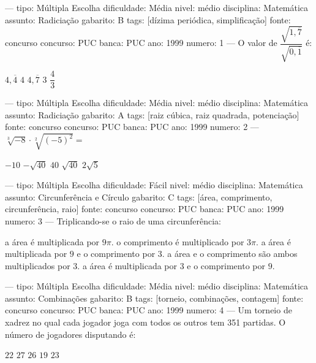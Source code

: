 
---
tipo: Múltipla Escolha
dificuldade: Média
nivel: médio
disciplina: Matemática
assunto: Radiciação
gabarito: B
tags: [dízima periódica, simplificação]
fonte: concurso
concurso: PUC
banca: PUC
ano: 1999
numero: 1
---
\question
O valor de $\dfrac{\sqrt{1{,}\overline{7}}}{\sqrt{0{,}\overline{1}}}$ é:
\begin{choices}
\choice $4{,}\overline{4}$
\CorrectChoice $4$
\choice $4{,}\overline{7}$
\choice $3$
\choice $\dfrac{4}{3}$
\end{choices}

---
tipo: Múltipla Escolha
dificuldade: Média
nivel: médio
disciplina: Matemática
assunto: Radiciação
gabarito: A
tags: [raiz cúbica, raiz quadrada, potenciação]
fonte: concurso
concurso: PUC
banca: PUC
ano: 1999
numero: 2
---
\question
$\sqrt[3]{-8} \cdot \sqrt[2]{(-5)^2} =$
\begin{choices}
\CorrectChoice $-10$
\choice $-\sqrt{40}$
\choice $40$
\choice $\sqrt{40}$
\choice $2\sqrt{5}$
\end{choices}

---
tipo: Múltipla Escolha
dificuldade: Fácil
nivel: médio
disciplina: Matemática
assunto: Circunferência e Círculo
gabarito: C
tags: [área, comprimento, circunferência, raio]
fonte: concurso
concurso: PUC
banca: PUC
ano: 1999
numero: 3
---
\question
Triplicando-se o raio de uma circunferência:
\begin{choices}
\choice a área é multiplicada por $9\pi$.
\choice o comprimento é multiplicado por $3\pi$.
\CorrectChoice a área é multiplicada por $9$ e o comprimento por $3$.
\choice a área e o comprimento são ambos multiplicados por $3$.
\choice a área é multiplicada por $3$ e o comprimento por $9$.
\end{choices}

---
tipo: Múltipla Escolha
dificuldade: Média
nivel: médio
disciplina: Matemática
assunto: Combinações
gabarito: B
tags: [torneio, combinações, contagem]
fonte: concurso
concurso: PUC
banca: PUC
ano: 1999
numero: 4
---
\question
Um torneio de xadrez no qual cada jogador joga com todos os outros tem 351 partidas. O número de jogadores disputando é:
\begin{choices}
\choice $22$
\CorrectChoice $27$
\choice $26$
\choice $19$
\choice $23$
\end{choices}

